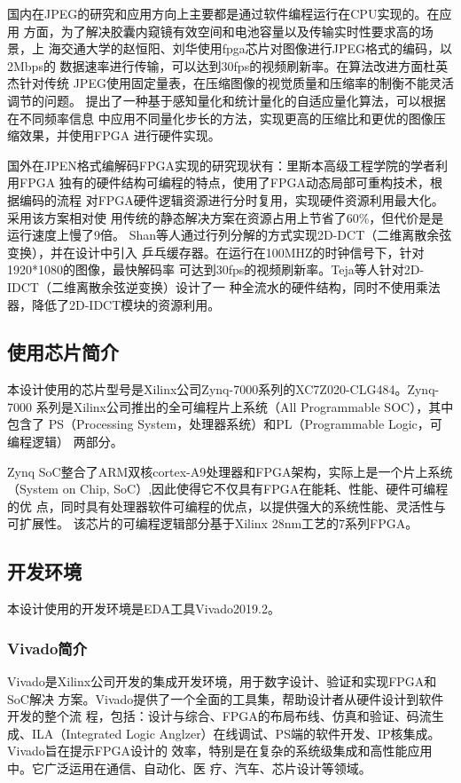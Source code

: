 \documentclass{article}
\numberwithin {equation}{section}
\begin{document}
\begin{spacing}{1.25}
    国内在JPEG的研究和应用方向上主要都是通过软件编程运行在CPU实现的。在应用
    方面，为了解决胶囊内窥镜有效空间和电池容量以及传输实时性要求高的场景，上
    海交通大学的赵恒阳、刘华使用fpga芯片对图像进行JPEG格式的编码，以2Mbps的
    数据速率进行传输，可以达到30fps的视频刷新率。在算法改进方面杜英杰针对传统
    JPEG使用固定量表，在压缩图像的视觉质量和压缩率的制衡不能灵活调节的问题。
    提出了一种基于感知量化和统计量化的自适应量化算法，可以根据在不同频率信息
    中应用不同量化步长的方法，实现更高的压缩比和更优的图像压缩效果，并使用FPGA
    进行硬件实现。

    国外在JPEN格式编解码FPGA实现的研究现状有：里斯本高级工程学院的学者利用FPGA
    独有的硬件结构可编程的特点，使用了FPGA动态局部可重构技术，根据编码的流程
    对FPGA硬件逻辑资源进行分时复用，实现硬件资源利用最大化。采用该方案相对使
    用传统的静态解决方案在资源占用上节省了60\%，但代价是是运行速度上慢了9倍。
    Shan等人通过行列分解的方式实现2D-DCT（二维离散余弦变换），并在设计中引入
    乒乓缓存器。在运行在100MHZ的时钟信号下，针对1920*1080的图像，最快解码率
    可达到30fps的视频刷新率。Teja等人针对2D-IDCT（二维离散余弦逆变换）设计了一
    种全流水的硬件结构，同时不使用乘法器，降低了2D-IDCT模块的资源利用。
  \subsection{使用芯片简介}
    \vspace{1em}
    本设计使用的芯片型号是Xilinx公司Zynq-7000系列的XC7Z020-CLG484。Zynq-7000
    系列是Xilinx公司推出的全可编程片上系统（All Programmable SOC），其中包含了
    PS（Processing System，处理器系统）和PL（Programmable Logic，可编程逻辑）
    两部分。

    Zynq SoC整合了ARM双核cortex-A9处理器和FPGA架构，实际上是一个片上系统
    （System on Chip, SoC）,因此使得它不仅具有FPGA在能耗、性能、硬件可编程的优
    点，同时具有处理器软件可编程的优点，以提供强大的系统性能、灵活性与可扩展性。
    该芯片的可编程逻辑部分基于Xilinx 28nm工艺的7系列FPGA。
  \subsection{开发环境}
    本设计使用的开发环境是EDA工具Vivado2019.2。
    \subsubsection{Vivado简介}
    \vspace{1em}
      Vivado是Xilinx公司开发的集成开发环境，用于数字设计、验证和实现FPGA和SoC解决
      方案。Vivado提供了一个全面的工具集，帮助设计者从硬件设计到软件开发的整个流
      程，包括：设计与综合、FPGA的布局布线、仿真和验证、码流生成、ILA（Integrated
       Logic Anglzer）在线调试、PS端的软件开发、IP核集成。Vivado旨在提示FPGA设计的
       效率，特别是在复杂的系统级集成和高性能应用中。它广泛运用在通信、自动化、医
       疗、汽车、芯片设计等领域。


\end{spacing}
\end{document}
